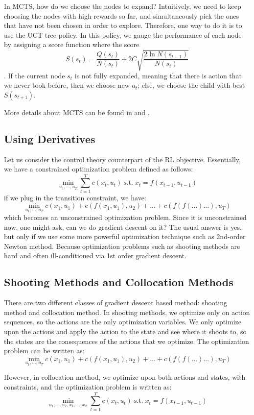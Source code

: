 In MCTS, how do we choose the nodes to expand? Intuitively, we need to keep choosing the nodes with high rewards so far, and simultaneously pick the ones that have not been chosen in order to explore. Therefore, one way to do it is to use the UCT tree policy. In this policy, we gauge the performance of each node by assigning a score function where the score
\[S(s_t) = \frac{Q(s_t)}{N(s_t)}+2C\sqrt{\frac{2\ln{N(s_{t-1})}}{N(s_t)}}\]. If the current node $s_t$ is not fully expanded, meaning that there is action that we never took before, then we choose new $a_t$; else, we choose the child with best $S(s_{t+1})$.

More details about MCTS can be found in \cite{browne2012survey} and \cite{guo2014deep}.

\subsection{Using Derivatives}
Let us consider the control theory counterpart of the RL objective. Essentially, we have a constrained optimization problem defined as follows:
$$\min_{u_1,...,u_T}\sum_{t=1}^Tc(x_t,u_t)\;\mathrm{s.t.}\;x_t = f(x_{t-1}, u_{t-1})$$
if we plug in the transition constraint, we have:
$$\min_{u_1,...,u_T}c(x_1,u_1) + c(f(x_1,u_1),u_2)+...+c(f(f(...)...),u_T)$$
which becomes an unconstrained optimization problem. Since it is unconstrained now, one might ask, can we do gradient descent on it? The usual answer is yes, but only if we use some more powerful optimization technique such as 2nd-order Newton method. Because optimization problems such as shooting methods are hard and often ill-conditioned via 1st order gradient descent. 
\subsection{Shooting Methods and Collocation Methods}
There are two different classes of gradient descent based method: shooting method and collocation method. In shooting methods, we optimize only on action sequences, so the actions are the only optimization variables. We only optimize upon the actions and apply the action to the state and see where it shoots to, so the states are the consequences of the actions that we optimize. The optimization problem can be written as:
$$\min_{u_1,...,u_T}c(x_1,u_1) + c(f(x_1,u_1),u_2)+...+c(f(f(...)...),u_T)$$

However, in collocation method, we optimize upon both actions and states, with constraints, and the optimization problem is written as:
$$\min_{u_1,...,u_T,x_1,...,x_T}\sum_{t=1}^Tc(x_t,u_t)\;\mathrm{s.t.}\;x_t = f(x_{t-1}, u_{t-1})$$

